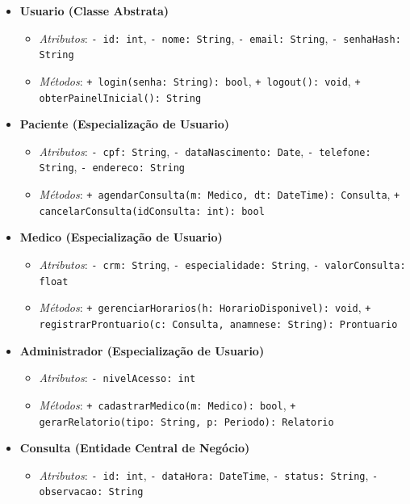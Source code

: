 \begin{itemize}
    \item \textbf{Usuario (Classe Abstrata)}
    \begin{itemize}
        \item \textit{Atributos}: \texttt{- id: int}, \texttt{- nome: String}, \texttt{- email: String}, \texttt{- senhaHash: String}
        \item \textit{Métodos}: \texttt{+ login(senha: String): bool}, \texttt{+ logout(): void}, \texttt{+ obterPainelInicial(): String}
    \end{itemize}
    \item \textbf{Paciente (Especialização de Usuario)}
    \begin{itemize}
        \item \textit{Atributos}: \texttt{- cpf: String}, \texttt{- dataNascimento: Date}, \texttt{- telefone: String}, \texttt{- endereco: String}
        \item \textit{Métodos}: \texttt{+ agendarConsulta(m: Medico, dt: DateTime): Consulta}, \newline \texttt{+ cancelarConsulta(idConsulta: int): bool}
    \end{itemize}
    \item \textbf{Medico (Especialização de Usuario)}
    \begin{itemize}
        \item \textit{Atributos}: \texttt{- crm: String}, \texttt{- especialidade: String}, \texttt{- valorConsulta: float}
        \item \textit{Métodos}: \texttt{+ gerenciarHorarios(h: HorarioDisponivel): void}, \newline \texttt{+ registrarProntuario(c: Consulta, anamnese: String): Prontuario}
    \end{itemize}
    \item \textbf{Administrador (Especialização de Usuario)}
    \begin{itemize}
        \item \textit{Atributos}: \texttt{- nivelAcesso: int}
        \item \textit{Métodos}: \texttt{+ cadastrarMedico(m: Medico): bool}, \newline \texttt{+ gerarRelatorio(tipo: String, p: Periodo): Relatorio}
    \end{itemize}
    \item \textbf{Consulta (Entidade Central de Negócio)}
    \begin{itemize}
        \item \textit{Atributos}: \texttt{- id: int}, \texttt{- dataHora: DateTime}, \texttt{- status: String}, \texttt{- observacao: String}

\end{itemize}
\end{itemize}

